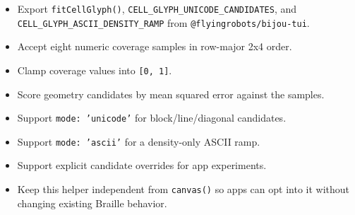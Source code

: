 \begin{itemize}
\tightlist
\item
  Export \texttt{f\allowbreak{}i\allowbreak{}t\allowbreak{}C\allowbreak{}e\allowbreak{}l\allowbreak{}l\allowbreak{}G\allowbreak{}l\allowbreak{}y\allowbreak{}p\allowbreak{}h\allowbreak{}(\allowbreak{})}, \texttt{C\allowbreak{}E\allowbreak{}L\allowbreak{}L\allowbreak{}\_\allowbreak{}G\allowbreak{}L\allowbreak{}Y\allowbreak{}P\allowbreak{}H\allowbreak{}\_\allowbreak{}U\allowbreak{}N\allowbreak{}I\allowbreak{}C\allowbreak{}O\allowbreak{}D\allowbreak{}E\allowbreak{}\_\allowbreak{}C\allowbreak{}A\allowbreak{}N\allowbreak{}D\allowbreak{}I\allowbreak{}D\allowbreak{}A\allowbreak{}T\allowbreak{}E\allowbreak{}S}, and \texttt{C\allowbreak{}E\allowbreak{}L\allowbreak{}L\allowbreak{}\_\allowbreak{}G\allowbreak{}L\allowbreak{}Y\allowbreak{}P\allowbreak{}H\allowbreak{}\_\allowbreak{}A\allowbreak{}S\allowbreak{}C\allowbreak{}I\allowbreak{}I\allowbreak{}\_\allowbreak{}D\allowbreak{}E\allowbreak{}N\allowbreak{}S\allowbreak{}I\allowbreak{}T\allowbreak{}Y\allowbreak{}\_\allowbreak{}R\allowbreak{}A\allowbreak{}M\allowbreak{}P} from \texttt{@\allowbreak{}f\allowbreak{}l\allowbreak{}y\allowbreak{}i\allowbreak{}n\allowbreak{}g\allowbreak{}r\allowbreak{}o\allowbreak{}b\allowbreak{}o\allowbreak{}t\allowbreak{}s\allowbreak{}/\allowbreak{}b\allowbreak{}i\allowbreak{}j\allowbreak{}o\allowbreak{}u\allowbreak{}-\allowbreak{}t\allowbreak{}u\allowbreak{}i}.
\item
  Accept eight numeric coverage samples in row-major 2x4 order.
\item
  Clamp coverage values into \texttt{[\allowbreak{}0\allowbreak{},\allowbreak{} \allowbreak{}1\allowbreak{}]}.
\item
  Score geometry candidates by mean squared error against the samples.
\item
  Support \texttt{m\allowbreak{}o\allowbreak{}d\allowbreak{}e\allowbreak{}:\allowbreak{} \allowbreak{}'\allowbreak{}u\allowbreak{}n\allowbreak{}i\allowbreak{}c\allowbreak{}o\allowbreak{}d\allowbreak{}e\allowbreak{}'} for block/line/diagonal candidates.
\item
  Support \texttt{m\allowbreak{}o\allowbreak{}d\allowbreak{}e\allowbreak{}:\allowbreak{} \allowbreak{}'\allowbreak{}a\allowbreak{}s\allowbreak{}c\allowbreak{}i\allowbreak{}i\allowbreak{}'} for a density-only ASCII ramp.
\item
  Support explicit candidate overrides for app experiments.
\item
  Keep this helper independent from \texttt{c\allowbreak{}a\allowbreak{}n\allowbreak{}v\allowbreak{}a\allowbreak{}s\allowbreak{}(\allowbreak{})} so apps can opt into it without changing existing Braille behavior.
\end{itemize}


